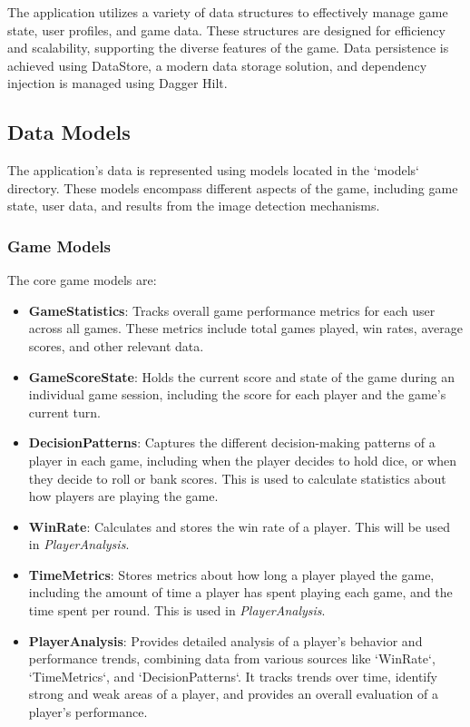 The application utilizes a variety of data structures to effectively manage game state, user profiles, and game data. These structures are designed for efficiency and scalability, supporting the diverse features of the game. Data persistence is achieved using DataStore, a modern data storage solution, and dependency injection is managed using Dagger Hilt.

\subsection{Data Models}

The application's data is represented using models located in the `models` directory. These models encompass different aspects of the game, including game state, user data, and results from the image detection mechanisms.

\subsubsection{Game Models}

The core game models are:
\begin{itemize}
    \item \textbf{GameStatistics}: Tracks overall game performance metrics for each user across all games. These metrics include total games played, win rates, average scores, and other relevant data.
    \item \textbf{GameScoreState}: Holds the current score and state of the game during an individual game session, including the score for each player and the game's current turn.
     \item \textbf{DecisionPatterns}: Captures the different decision-making patterns of a player in each game, including when the player decides to hold dice, or when they decide to roll or bank scores. This is used to calculate statistics about how players are playing the game.
    \item \textbf{WinRate}: Calculates and stores the win rate of a player. This will be used in \textit{PlayerAnalysis}.
    \item \textbf{TimeMetrics}: Stores metrics about how long a player played the game, including the amount of time a player has spent playing each game, and the time spent per round. This is used in \textit{PlayerAnalysis}.
    \item \textbf{PlayerAnalysis}: Provides detailed analysis of a player's behavior and performance trends, combining data from various sources like `WinRate`, `TimeMetrics`, and `DecisionPatterns`. It tracks trends over time, identify strong and weak areas of a player, and provides an overall evaluation of a player's performance.
\end{itemize}


